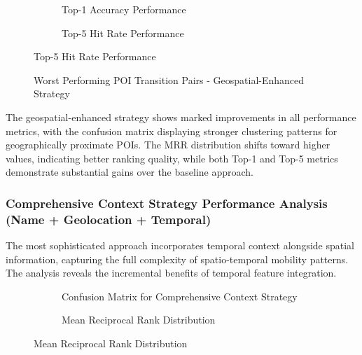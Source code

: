 \documentclass[12pt,a4paper]{article}
\begin{document}
\begin{figure}[h]
\centering
\begin{subfigure}{0.48\textwidth}
\centering
\caption{Top-1 Accuracy Performance}
\label{fig:geospatial_top1}
\end{subfigure}
\hfill
\begin{subfigure}{0.48\textwidth}
\centering
\caption{Top-5 Hit Rate Performance}
\label{fig:geospatial_top5}
\end{subfigure}
\end{figure}

\begin{figure}[h]
\centering
\caption{Worst Performing POI Transition Pairs - Geospatial-Enhanced Strategy}
\label{fig:geospatial_worst_pairs}
\end{figure}

The geospatial-enhanced strategy shows marked improvements in all performance metrics, with the confusion matrix displaying stronger clustering patterns for geographically proximate POIs. The MRR distribution shifts toward higher values, indicating better ranking quality, while both Top-1 and Top-5 metrics demonstrate substantial gains over the baseline approach.

\subsubsection{Comprehensive Context Strategy Performance Analysis (Name + Geolocation + Temporal)}

The most sophisticated approach incorporates temporal context alongside spatial information, capturing the full complexity of spatio-temporal mobility patterns. The analysis reveals the incremental benefits of temporal feature integration.

\begin{figure}[h]
\centering
\begin{subfigure}{0.48\textwidth}
\centering
\caption{Confusion Matrix for Comprehensive Context Strategy}
\label{fig:comprehensive_confusion}
\end{subfigure}
\hfill
\begin{subfigure}{0.48\textwidth}
\centering
\caption{Mean Reciprocal Rank Distribution}
\label{fig:comprehensive_mrr}
\end{subfigure}
\end{figure}
\end{document}

